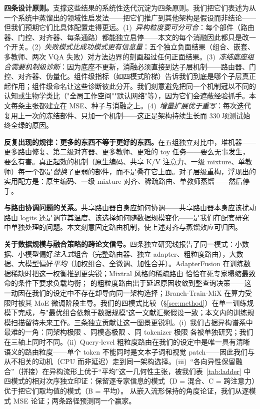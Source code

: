 \documentclass[10pt,twoside]{article}
\begin{document}
\textbf{四条设计原则。}支撑这些结果的系统性迭代沉淀为四条原则。我们把它们表述为从一个系统中蒸馏出的领域性启发法——把它们推广到其他架构是假设而非结论——但我们预期它们比具体配置走得更远。(1)~\emph{异构粒度要可分可合}：每个部件（路由器、门控、对齐器、每条通路）都能独立启停——本文的每个消融因此都只是改一个开关。(2)~\emph{失败模式比成功模式更有信息量}：五个独立负面结果（组合、嵌套、多教师、两次 VQA 失败）对方法边界的刻画超过任何正面结果。(3)~\emph{冻结底座组合需要机制级诊断}：因为底座不更新，消融必须直接到达子层机制——路由器、门控、对齐器、伪量化。组件级指标（如四模式阶梯）告诉我们到底是哪个子层真正起作用；组件级命名让这些诊断彼此分开。我们刻意避免把同一个机制冠以不同的认知或生物学类比（"全局工作空间""默认网络"等），因为它们会遮蔽经验抓手。本文每条主张都建立在 MSE、种子与消融之上。(4)~\emph{增量扩展优于重写}：每次迭代复用上一次的冻结部件、只加一个机制——这正是架构持续生长而 330 项测试始终全绿的原因。

\textbf{反复出现的规律：更多的东西不等于更好的东西。}在五组独立对比中，堆机器——更多路由修复、第二级对齐器、更多教师、更难的 toy 任务——要么无事发生，要么有害。真正起效的机制（原生编码、共享 K/V 注意力、一级 mixture、单教师）每一个都是\emph{替换}了更弱的部件，而不是叠在它上面。对子层级重构，浮现出的实用配方是：原生编码、一级 mixture 对齐、稀疏路由、单教师蒸馏——然后停手。

\textbf{与路由协调问题的关系。}共享路由器自身应如何协调——共享路由器本身应该扰动路由 logits 还是调节其温度、该选择如何随数据规模变化——是我们在配套研究中单独处理的问题。本文刻意固定路由机制，使上述对齐与蒸馏效应可归因。

\textbf{关于数据规模与融合策略的跨论文信号。}四条独立研究线报告了同一模式：小数据、小模型偏好\emph{注入式}组合（完整路由器、独立 adapter、粗粒度路由），大数据、大模型偏好\emph{平均}（加权组合、全微调、加性合并）。AdapterFusion \citep{pfeiffer2021} 在训练数据稀缺时把这一权衡推到更尖锐；Mixtral 风格的稀疏路由 \citep{jiang2024mixtral} 恰恰在死专家塌缩最致命的条件下要求负载均衡；\citet{liu2026orchestrating} 的粗粒度路由出于延迟原因收敛到整查询决策——这一动因在我们的设定中不存在却导向同一架构选择；Branch-Train-MiX \citep{sukhbaatar2024btx} 在算力受限时被其 MoE 微调阶段主导。我们的四模式比较（\S\ref{sec:method}）在单一训练规模下完成，与"最优组合依赖于数据规模"这一文献汇聚假设一致；本文内的训练规模扫描留待未来工作。三条独立贡献让这一图景更锐利。(i)~我们占据异构谱系中最难的一角：同架构极限 \citep{komatsuzaki2023,sukhbaatar2024btx,puigcerver2024softmoe}、同模态极限 \citep{wang2024scalekd}、同 tokenizer 极限 \citep{wang2025symphony,liu2026orchestrating} 各被单独研究；我们在三轴上同时不同。(ii)~Query-level 粗粒度路由在我们的设定中是唯一具有清晰语义的路由粒度——单个 token 不能同时是文本子词和视觉 patch——因此我们与\citet{liu2026orchestrating} 从不相关的动机（CPU 而非延迟）走到同一架构选择。(iii)~``各向异性保留融合''（拼接）在异构流形上优于``平均''这一几何性主张，被我们表~\ref{tab:ladder} 中四模式的相对次序独立印证：保留逐专家信息的模式（D = 混合、C = 跨注意力）优于把它们取均值的模式（B = 平均）。\citet{liu2026orchestrating} 从嵌入流形保持的角度论证，我们从逐模式 MSE 论证；两条路径预测同一个赢家。
\end{document}
